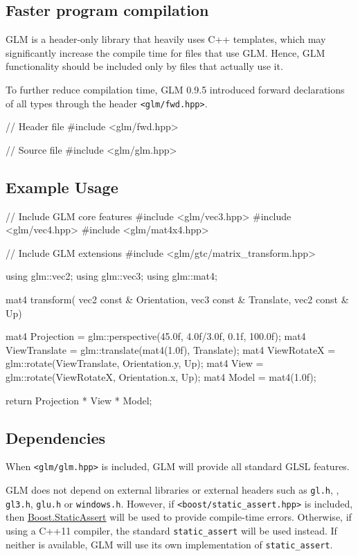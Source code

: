 \documentclass{scrartcl}
\numberwithin{figure}{subsection}
\begin{document}
\subsection{Faster program compilation}
GLM is a header-only library that heavily uses C++ templates, which may significantly increase the compile time for files that use GLM. Hence, GLM functionality should be included only by files that actually use it.

To further reduce compilation time, GLM 0.9.5 introduced forward declarations of all types through the header \verb|<glm/fwd.hpp>|.

\begin{cppcode}
// Header file
#include <glm/fwd.hpp>
\end{cppcode}

\begin{cppcode}
// Source file
#include <glm/glm.hpp>
\end{cppcode}

\subsection{Example Usage}

\begin{cppcode}
// Include GLM core features
#include <glm/vec3.hpp>
#include <glm/vec4.hpp>
#include <glm/mat4x4.hpp>

// Include GLM extensions
#include <glm/gtc/matrix_transform.hpp>

using glm::vec2;
using glm::vec3;
using glm::mat4;

mat4 transform(
  vec2 const & Orientation, 
  vec3 const & Translate,
  vec2 const & Up)
{
  mat4 Projection = glm::perspective(45.0f, 4.0f/3.0f, 0.1f, 100.0f);
  mat4 ViewTranslate = glm::translate(mat4(1.0f), Translate);
  mat4 ViewRotateX = glm::rotate(ViewTranslate, Orientation.y, Up);
  mat4 View = glm::rotate(ViewRotateX, Orientation.x, Up);
  mat4 Model = mat4(1.0f);
        
  return Projection * View * Model;
}
\end{cppcode}


\subsection{Dependencies}

When \verb|<glm/glm.hpp>| is included, GLM will provide all standard GLSL features.

GLM does not depend on external libraries or external headers such as \verb|gl.h|, , \verb|gl3.h|, \verb|glu.h| or \verb|windows.h|. However, if \verb|<boost/static_assert.hpp>| is included, then  \href{http://www.boost.org/doc/libs/release/libs/static_assert/}{Boost.StaticAssert}  will be used to provide compile-time errors.  Otherwise, if using a C++11 compiler, the standard \verb|static_assert| will be used instead. If neither is available, GLM will use its own implementation of \verb|static_assert|.
\end{document}
